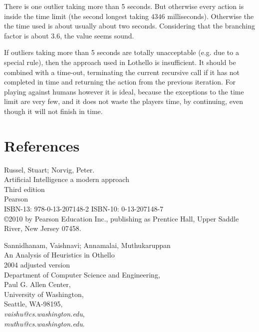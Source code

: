 \documentclass[a4paper,11pt]{article}
\begin{document}
There is one outlier taking more than 5 seconds. But otherwise every action is inside the time limit (the second longest taking $4346$ milliseconds). Otherwise the the time used is about usually about two seconds. Considering that the branching factor is about $3.6$, the value seems sound.

If outliers taking more than 5 seconds are totally unacceptable (e.g. due to a special rule), then the approach used in Lothello is insufficient. It should be combined with a time-out, terminating the current recursive call if it has not completed in time and returning the action from the previous iteration. For playing against humans however it is ideal, because the exceptions to the time limit are very few, and it does not waste the players time, by continuing, even though it will not finish in time.

\clearpage

\section{References}
\begin{thebibliography}{99}

 Russel, Stuart; Norvig, Peter. \\
Artificial Intelligence a modern approach \\
Third edition \\
Pearson \\
ISBN-13:	978-0-13-207148-2
ISBN-10:	0-13-207148-7 \\
\copyright 2010 by Pearson Education Inc., publishing as Prentice Hall, Upper Saddle River, New Jersey 07458.

 Sannidhanam, Vaishnavi; Annamalai, Muthukaruppan \\
An Analysis of Heuristics in Othello \\
2004 adjusted version \\
Department of Computer Science and Engineering, \\
Paul G. Allen Center, \\
University of Washington, \\
Seattle, WA-98195, \\
\textit{vaishu@cs.washington.edu}, \\
\textit{muthu@cs.washington.edu}.

\end{thebibliography}
\end{document}
